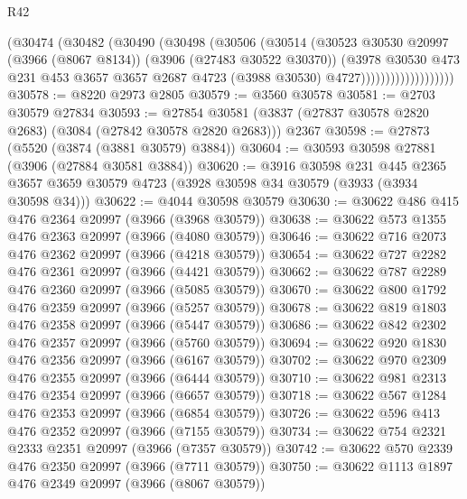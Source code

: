 \begin{lexlean}{R42}
\begin{coremodule}
                          (@30474
                            (@30482
                              (@30490
                                (@30498
                                  (@30506
                                    (@30514
                                      (@30523
                                        @30530
                                        @20997
                                        (@3966 (@8067 @8134))
                                        (@3906 (@27483 @30522 @30370))
                                        (@3978
                                          @30530
                                          @473
                                          @231
                                          @453
                                          @3657
                                          @3657
                                          @2687
                                          @4723
                                          (@3988 @30530)
                                          @4727)))))))))))))))))))
@30578 := @8220 @2973 @2805
@30579 := @3560 @30578
@30581 := @2703 @30579 @27834
@30593 := @27854
    @30581
    (@3837 (@27837 @30578 @2820 @2683) (@3084 (@27842 @30578 @2820 @2683)))
    @2367
@30598 := @27873 (@5520 (@3874 (@3881 @30579) @3884))
@30604 := @30593 @30598 @27881 (@3906 (@27884 @30581 @3884))
@30620 := @3916
    @30598
    @231
    @445
    @2365
    @3657
    @3659
    @30579
    @4723
    (@3928 @30598 @34 @30579 (@3933 (@3934 @30598 @34)))
@30622 := @4044 @30598 @30579
@30630 := @30622 @486 @415 @476 @2364 @20997 (@3966 (@3968 @30579))
@30638 := @30622 @573 @1355 @476 @2363 @20997 (@3966 (@4080 @30579))
@30646 := @30622 @716 @2073 @476 @2362 @20997 (@3966 (@4218 @30579))
@30654 := @30622 @727 @2282 @476 @2361 @20997 (@3966 (@4421 @30579))
@30662 := @30622 @787 @2289 @476 @2360 @20997 (@3966 (@5085 @30579))
@30670 := @30622 @800 @1792 @476 @2359 @20997 (@3966 (@5257 @30579))
@30678 := @30622 @819 @1803 @476 @2358 @20997 (@3966 (@5447 @30579))
@30686 := @30622 @842 @2302 @476 @2357 @20997 (@3966 (@5760 @30579))
@30694 := @30622 @920 @1830 @476 @2356 @20997 (@3966 (@6167 @30579))
@30702 := @30622 @970 @2309 @476 @2355 @20997 (@3966 (@6444 @30579))
@30710 := @30622 @981 @2313 @476 @2354 @20997 (@3966 (@6657 @30579))
@30718 := @30622 @567 @1284 @476 @2353 @20997 (@3966 (@6854 @30579))
@30726 := @30622 @596 @413 @476 @2352 @20997 (@3966 (@7155 @30579))
@30734 := @30622 @754 @2321 @2333 @2351 @20997 (@3966 (@7357 @30579))
@30742 := @30622 @570 @2339 @476 @2350 @20997 (@3966 (@7711 @30579))
@30750 := @30622 @1113 @1897 @476 @2349 @20997 (@3966 (@8067 @30579))

\end{coremodule}
\end{lexlean}
